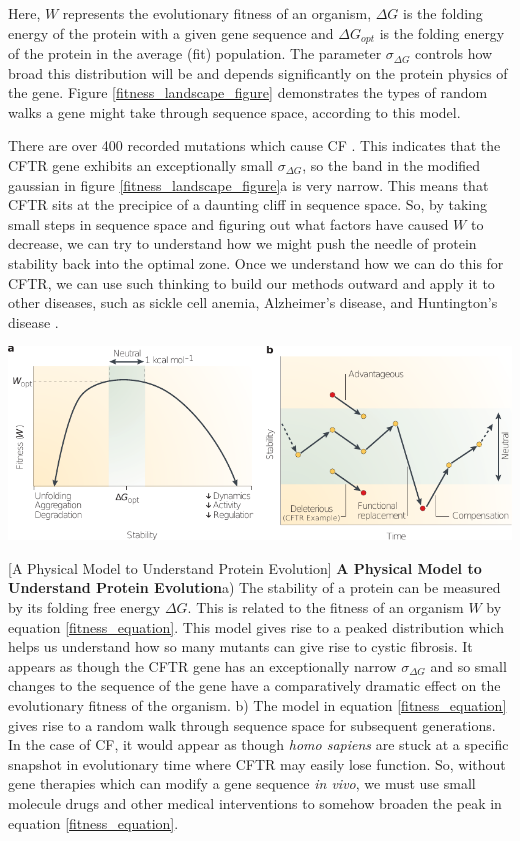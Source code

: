 Here, $W$ represents the evolutionary fitness of an organism, $\Delta G$ is the folding energy of the protein with a given gene sequence and $\Delta G_{opt}$ is the folding energy of the protein in the average (fit) population. The parameter $\sigma_{\Delta G}$ controls how broad this distribution will be and depends significantly on the protein physics of the gene. Figure \ref{fitness_landscape_figure} demonstrates the types of random walks a gene might take through sequence space, according to this model. 

There are over 400 recorded mutations which cause CF \cite{cftr2}. This indicates that  the CFTR gene exhibits an exceptionally small $\sigma_{\Delta G}$, so the band in the modified gaussian in figure \ref{fitness_landscape_figure}a is very narrow. This means that CFTR sits at the precipice of a daunting cliff in sequence space.  So, by taking small steps in sequence space and figuring out what factors have caused $W$ to decrease, we can try to understand how we might push the needle of protein stability back into the optimal zone. Once we understand how we can do this for CFTR, we can use such thinking to build our methods outward and apply it to other diseases, such as sickle cell anemia, Alzheimer's disease, and Huntington's disease \cite{depristo2005}.

	\begin{center}
		\includegraphics[width=1.0\textwidth]{figures/fitness_landscape_fig.pdf}
	\end{center}
	\begingroup
	\captionsetup{singlelinecheck = false, justification=raggedright}
	[A Physical Model to Understand Protein Evolution] {\textbf{A Physical Model to Understand Protein Evolution}}{a) The stability of a protein can be measured by its folding free energy $\Delta G$. This is related to the fitness of an organism $W$ by equation \ref{fitness_equation}. This model gives rise to a peaked distribution which helps us understand how so many mutants can give rise to cystic fibrosis. It appears as though the CFTR gene has an exceptionally narrow $\sigma_{\Delta G}$ and so small changes to the sequence of the gene have a comparatively dramatic effect on the evolutionary fitness of the organism. b) The model in equation \ref{fitness_equation} gives rise to a random walk through sequence space for subsequent generations. In the case of CF, it would appear as though \textit{homo sapiens} are stuck at a specific snapshot in evolutionary time where CFTR may easily lose function. So, without gene therapies which can modify a gene sequence \textit {in vivo}, we must use small molecule drugs and other medical interventions to somehow broaden the peak in equation \ref{fitness_equation}.}
	\label{fitness_landscape_figure}
\endgroup

